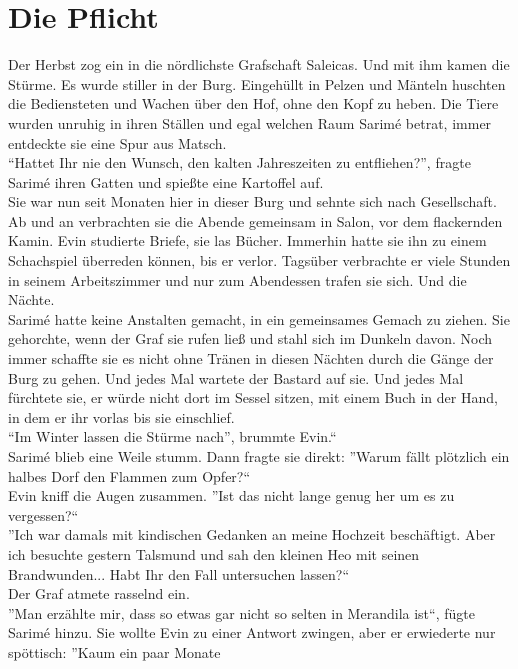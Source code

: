 
\chapter{Die Pflicht}

Der Herbst zog ein in die nördlichste Grafschaft Saleicas. Und mit ihm kamen die Stürme. Es wurde 
stiller in der Burg. Eingehüllt in Pelzen und Mänteln huschten die Bediensteten und Wachen über den 
Hof, ohne den Kopf zu heben. Die Tiere wurden unruhig in ihren Ställen und egal welchen Raum Sarimé 
betrat, immer entdeckte sie eine Spur aus Matsch.\\
``Hattet Ihr nie den Wunsch, den kalten Jahreszeiten zu entfliehen?'', fragte Sarimé ihren Gatten 
und spießte eine Kartoffel auf.\\
Sie war nun seit Monaten hier in dieser Burg und sehnte sich nach Gesellschaft. Ab und an 
verbrachten sie die Abende gemeinsam in Salon, vor dem flackernden Kamin. Evin studierte Briefe, sie 
las Bücher. Immerhin hatte sie ihn zu einem Schachspiel überreden können, bis er verlor. Tagsüber 
verbrachte er viele Stunden in seinem Arbeitszimmer und nur zum Abendessen trafen sie sich. Und die 
Nächte.\\
Sarimé hatte keine Anstalten gemacht, in ein gemeinsames Gemach zu ziehen. Sie gehorchte, 
wenn der Graf sie rufen ließ und stahl sich im Dunkeln davon. Noch immer schaffte sie es nicht ohne 
Tränen in diesen Nächten durch die Gänge der Burg zu gehen. Und jedes Mal wartete der Bastard auf 
sie. Und jedes Mal fürchtete sie, er würde nicht dort im Sessel sitzen, mit einem Buch in der Hand, 
in dem er ihr vorlas bis sie einschlief.\\
``Im Winter lassen die Stürme nach'', brummte Evin.``\\
Sarimé blieb eine Weile stumm. Dann fragte sie direkt: ''Warum fällt plötzlich ein halbes Dorf den 
Flammen zum Opfer?``\\
Evin kniff die Augen zusammen. ''Ist das nicht lange genug her um es zu vergessen?``\\
''Ich war damals mit kindischen Gedanken an meine Hochzeit beschäftigt. Aber ich besuchte gestern 
Talsmund und sah den kleinen Heo mit seinen Brandwunden... Habt Ihr den Fall untersuchen 
lassen?``\\
Der Graf atmete rasselnd ein.\\
''Man erzählte mir, dass so etwas gar nicht so selten in Merandila ist``, fügte Sarimé hinzu. Sie 
wollte Evin zu einer Antwort zwingen, aber er erwiederte nur spöttisch: ''Kaum ein paar Monate 
